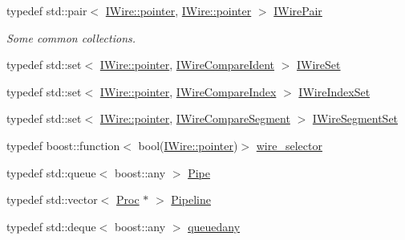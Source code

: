 \begin{DoxyCompactItemize}
\item 
typedef std\+::pair$<$ \hyperlink{class_wire_cell_1_1_i_data_aff870b3ae8333cf9265941eef62498bc}{I\+Wire\+::pointer}, \hyperlink{class_wire_cell_1_1_i_data_aff870b3ae8333cf9265941eef62498bc}{I\+Wire\+::pointer} $>$ \hyperlink{namespace_wire_cell_ad5f0e75d8f0e885d9ae4e9154e812d76}{I\+Wire\+Pair}
\begin{DoxyCompactList}\small\item\em Some common collections. \end{DoxyCompactList}\item 
typedef std\+::set$<$ \hyperlink{class_wire_cell_1_1_i_data_aff870b3ae8333cf9265941eef62498bc}{I\+Wire\+::pointer}, \hyperlink{struct_wire_cell_1_1_i_wire_compare_ident}{I\+Wire\+Compare\+Ident} $>$ \hyperlink{namespace_wire_cell_a18a6e1194ae1b701ea3ce7f931304e19}{I\+Wire\+Set}
\item 
typedef std\+::set$<$ \hyperlink{class_wire_cell_1_1_i_data_aff870b3ae8333cf9265941eef62498bc}{I\+Wire\+::pointer}, \hyperlink{struct_wire_cell_1_1_i_wire_compare_index}{I\+Wire\+Compare\+Index} $>$ \hyperlink{namespace_wire_cell_a59529e31ab6cb85f53642db06acdadac}{I\+Wire\+Index\+Set}
\item 
typedef std\+::set$<$ \hyperlink{class_wire_cell_1_1_i_data_aff870b3ae8333cf9265941eef62498bc}{I\+Wire\+::pointer}, \hyperlink{struct_wire_cell_1_1_i_wire_compare_segment}{I\+Wire\+Compare\+Segment} $>$ \hyperlink{namespace_wire_cell_aff640c8ffcb5478403ad4bcede30c54b}{I\+Wire\+Segment\+Set}
\item 
typedef boost\+::function$<$ bool(\hyperlink{class_wire_cell_1_1_i_data_aff870b3ae8333cf9265941eef62498bc}{I\+Wire\+::pointer})$>$ \hyperlink{namespace_wire_cell_a9d7058ef4d388953ee9d03ff51509e51}{wire\+\_\+selector}
\item 
typedef std\+::queue$<$ boost\+::any $>$ \hyperlink{namespace_wire_cell_afce9bb01c731347c3d4c8ca9d4ed804f}{Pipe}
\item 
typedef std\+::vector$<$ \hyperlink{class_wire_cell_1_1_proc}{Proc} $\ast$ $>$ \hyperlink{namespace_wire_cell_a7f9ab409f961e35f837782a615c0020f}{Pipeline}
\item 
typedef std\+::deque$<$ boost\+::any $>$ \hyperlink{namespace_wire_cell_adf91b92bfda348a56a463737a79b6bbf}{queuedany}
\end{DoxyCompactItemize}
